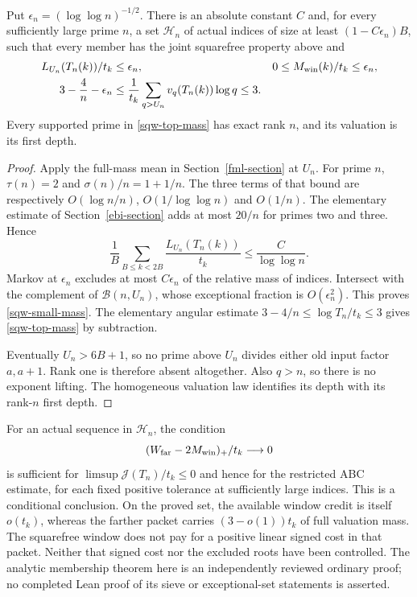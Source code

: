 \begin{theorem}
\label{sqw-far-mass}
Put $\epsilon_n=(\log\log n)^{-1/2}$. There is an absolute constant
$C$ and, for every sufficiently large prime $n$, a set $\mathcal H_n$
of actual indices of size at least $(1-C\epsilon_n)B$, such that every
member has the joint squarefree property above and
\begin{align}
 L_{U_n}(T_n(k))/t_k&\le\epsilon_n,&
 0\le M_{\rm win}(k)/t_k&\le\epsilon_n, \label{sqw-small-mass}\\
 3-\frac4n-\epsilon_n
 &\le\frac1{t_k}\sum_{q>U_n}v_q(T_n(k))\log q
 \le3. \label{sqw-top-mass}
\end{align}
Every supported prime in \eqref{sqw-top-mass} has exact rank $n$,
and its valuation is its first depth.
\end{theorem}
\begin{proof}
Apply the full-mass mean in Section~\ref{fml-section} at $U_n$.
For prime $n$, $\tau(n)=2$ and $\sigma(n)/n=1+1/n$.
The three terms of that bound are respectively
$O(\log n/n)$, $O(1/\log\log n)$ and $O(1/n)$.
The elementary estimate of Section~\ref{ebi-section} adds at most
$20/n$ for primes two and three. Hence
\[
 \frac1B\sum_{B\le k<2B}\frac{L_{U_n}(T_n(k))}{t_k}
 \le\frac{C}{\log\log n}.
\]
Markov at $\epsilon_n$ excludes at most $C\epsilon_n$ of the
relative mass of indices. Intersect with the complement of
$\mathcal B(n,U_n)$, whose exceptional fraction is
$O(\epsilon_n^2)$. This proves \eqref{sqw-small-mass}.
The elementary angular estimate
$3-4/n\le\log T_n/t_k\le3$ gives \eqref{sqw-top-mass}
by subtraction.

Eventually $U_n>6B+1$, so no prime above $U_n$ divides either old
input factor $a,a+1$. Rank one is therefore absent altogether.
Also $q>n$, so there is no exponent lifting. The homogeneous
valuation law identifies its depth with its rank-$n$ first depth.
\end{proof}

For an actual sequence in $\mathcal H_n$, the condition
\[
 (W_{\rm far}-2M_{\rm win})_+/t_k\longrightarrow0
\]
is sufficient for $\limsup\mathcal J(T_n)/t_k\le0$ and hence for the
restricted ABC estimate, for each fixed positive tolerance at
sufficiently large indices. This is a conditional conclusion.
On the proved set, the available window credit is itself $o(t_k)$,
whereas the farther packet carries $(3-o(1))t_k$ of full valuation
mass. The squarefree window does not pay for a positive linear
signed cost in that packet. Neither that signed cost nor the
excluded roots have been controlled. The analytic membership
theorem here is an independently reviewed ordinary proof; no
completed Lean proof of its sieve or exceptional-set statements
is asserted.
